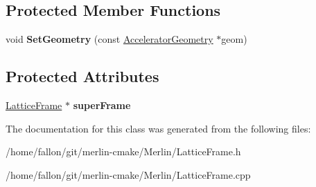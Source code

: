 \subsection*{Protected Member Functions}
\begin{DoxyCompactItemize}
\item 
\mbox{\label{classLatticeFrame_a0457bfa8d82df13f81663c45e9458023}} 
void {\bfseries Set\+Geometry} (const \hyperlink{classAcceleratorGeometry}{Accelerator\+Geometry} $\ast$geom)
\end{DoxyCompactItemize}
\subsection*{Protected Attributes}
\begin{DoxyCompactItemize}
\item 
\mbox{\label{classLatticeFrame_a57881cf05ff6484d8a9106be82007922}} 
\hyperlink{classLatticeFrame}{Lattice\+Frame} $\ast$ {\bfseries super\+Frame}
\end{DoxyCompactItemize}


The documentation for this class was generated from the following files\+:\begin{DoxyCompactItemize}
\item 
/home/fallon/git/merlin-\/cmake/\+Merlin/Lattice\+Frame.\+h\item 
/home/fallon/git/merlin-\/cmake/\+Merlin/Lattice\+Frame.\+cpp\end{DoxyCompactItemize}
